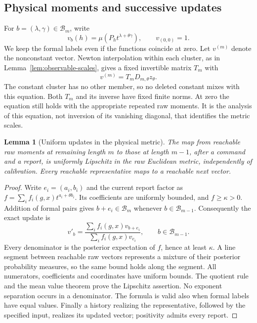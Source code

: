 \documentclass[11pt]{amsart}
\newtheorem{lemma}[theorem]{Lemma}
\theoremstyle{definition}\newtheorem{definition}[theorem]{Definition}
\theoremstyle{remark}\newtheorem{remark}[theorem]{Remark}
\begin{document}
\subsection{Physical moments and successive updates}
For $b=(\lambda,\gamma)\in\mathcal B_m$, write
\[
 v_b(h)=\mu(P_h t^{\lambda+\theta\gamma}),\qquad v_{(0,0)}=1.
\]
We keep the formal labels even if the functions coincide at zero.
Let $v^{(m)}$ denote the nonconstant vector. Newton interpolation within
each cluster, as in Lemma~\ref{lem:observable-scales}, gives a fixed
invertible matrix $T_m$ with
\begin{equation}\label{eq:raw-versus-scaled}
 v^{(m)}=T_mD_{m,\theta}z_\theta.
\end{equation}
The constant cluster has no other member, so no deleted constant mixes
with this equation. Both $T_m$ and its inverse have fixed finite norms.
At zero the equation still holds with the appropriate repeated raw
moments. It is the analysis of this equation, not inversion of its
vanishing diagonal, that identifies the metric scales.

\begin{lemma}[Uniform updates in the physical metric]\label{lem:raw-uniform-update}
The map from reachable raw moments at remaining length $m$ to those at
length $m-1$, after a command and a report, is uniformly Lipschitz in
the raw Euclidean metric, independently of calibration. Every reachable
representative maps to a reachable next vector.
\end{lemma}
\begin{proof}
Write $e_i=(a_i,b_i)$ and the current report factor as
$f=\sum_i f_i(g,x)t^{a_i+\theta b_i}$. Its coefficients are uniformly
bounded, and $f\ge\kappa>0$. Addition of formal pairs gives
$b+e_i\in\mathcal B_m$ whenever $b\in\mathcal B_{m-1}$.
Consequently the exact update is
\begin{equation}\label{eq:raw-causal-update}
 v'_b=\frac{\sum_i f_i(g,x)v_{b+e_i}}
                  {\sum_i f_i(g,x)v_{e_i}},
       \qquad b\in\mathcal B_{m-1}.
\end{equation}
Every denominator is the posterior expectation of $f$, hence at least
$\kappa$. A line segment between reachable raw vectors represents a
mixture of their posterior probability measures, so the same bound holds
along the segment. All numerators, coefficients and coordinates have
uniform bounds. The quotient rule and the mean value theorem prove the
Lipschitz assertion. No exponent separation occurs in a denominator.
The formula is valid also when formal labels have equal values. Finally
a history realizing the representative, followed by the specified input,
realizes its updated vector; positivity admits every report.
\end{proof}
\end{document}
